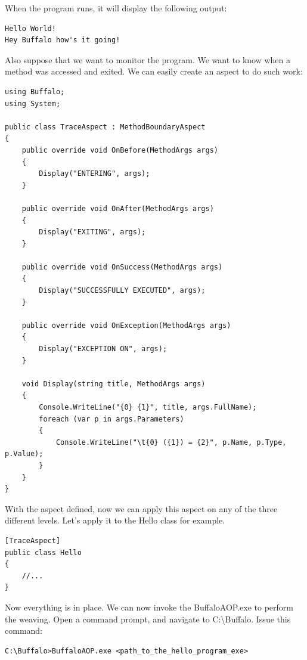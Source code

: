 When the program runs, it will display the following output:
\begin{lstlisting}[caption={Hello Program Output}, label=helloout, frame=tb, basicstyle=\scriptsize]
Hello World!
Hey Buffalo how's it going!
\end{lstlisting}

Also suppose that we want to monitor the program. We want to know when a method was accessed and exited. We can easily create an aspect to do such work:

\begin{lstlisting}[caption={TraceAspect}, label=traceaspect, frame=tb, basicstyle=\scriptsize]
using Buffalo;
using System;

public class TraceAspect : MethodBoundaryAspect
{
    public override void OnBefore(MethodArgs args)
    {
        Display("ENTERING", args);
    }

    public override void OnAfter(MethodArgs args)
    {
        Display("EXITING", args);
    }

    public override void OnSuccess(MethodArgs args)
    {
        Display("SUCCESSFULLY EXECUTED", args);
    }

    public override void OnException(MethodArgs args)
    {
        Display("EXCEPTION ON", args);
    }

    void Display(string title, MethodArgs args)
    {
        Console.WriteLine("{0} {1}", title, args.FullName);
        foreach (var p in args.Parameters)
        {
            Console.WriteLine("\t{0} ({1}) = {2}", p.Name, p.Type, p.Value);
        }
    }
}
\end{lstlisting}

With the aspect defined, now we can apply this aspect on any of the three different levels. Let's apply it to the Hello class for example.
\begin{lstlisting}[caption={Apply Aspect to the Hello Class}, label=helloaspect, frame=tb, basicstyle=\scriptsize]
[TraceAspect]
public class Hello
{
	//...
}
\end{lstlisting}

Now everything is in place. We can now invoke the BuffaloAOP.exe to perform the weaving. Open a command prompt, and navigate to C:\textbackslash{Buffalo}. Issue this command:

\begin{lstlisting}[caption={Invoking BuffaloAOP.exe}, label=buffalocmd, frame=tb, basicstyle=\scriptsize]
C:\Buffalo>BuffaloAOP.exe <path_to_the_hello_program_exe>
\end{lstlisting}

